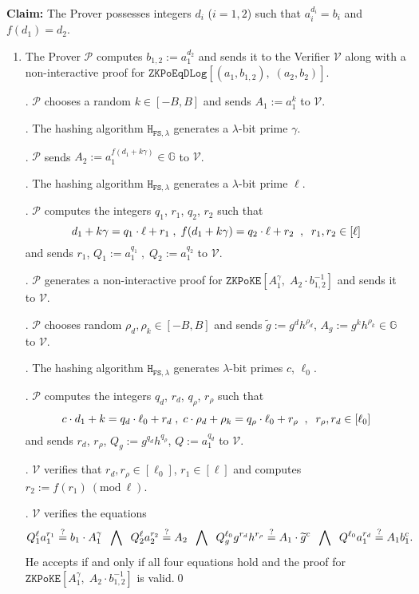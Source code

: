 \documentclass[11pt, lettersize, notitlepage, leqno, footskip=0.6cm]{article}
\newcommand{\ttt}{\texttt}
\newcommand{\bG}{\mathbb{G}}
\newcommand{\wti}{\widetilde}
\newcommand{\mc}{\mathcal}
\newcommand{\lam}{\lambda}
\newcommand{\mP}{\mc{P}}
\newcommand{\V}{\mc{V}}
\newcommand{\vs}{\vspace{-0.15cm}}
\newcommand{\noin}{\noindent}
\newcommand{\sta}{\stackrel{?}{=}}
\newcommand{\Mod}[1]{\ (\mathrm{mod}\ #1)}
\numberwithin{equation}{section}
\begin{document}
\noin \textbf{Claim:} The Prover possesses integers $d_i$ ($i=1,2$) such that $a_i^{d_i} = b_i$ and $f(d_1) = d_2$.

\begin{enumerate}[wide, labelwidth=!, labelindent=0pt]\vs \item  The Prover $\mP$ computes $b_{1,2}:= a_1^{d_2}$ and sends it to the Verifier $\V$ along with a non-interactive proof for $\ttt{ZKPoEqDLog}[(a_1,b_{1,2}),\;(a_2,b_2)]$.

\noin 2. $\mP$ chooses a random $k\in[-B,B]$ and sends $A_1:= a_1^{k}$ to $\V$.

\noin 3. The hashing algorithm $\ttt{H}_{\ttt{FS},\lam}$ generates a $\lam$-bit prime $\gamma$.

\noin 4. $\mP$ sends $A_2:= a_1^{f(d_1+k\gamma)}\in\bG$ to $\V$.

\noin 5. The hashing algorithm $\ttt{H}_{\ttt{FS},\lam}$ generates a $\lam$-bit prime $\ell$.

\noin 6. $\mP$ computes the integers $q_1$, $r_1$, $q_2$, $r_2$ such that \vs $$d_1+k\gamma = q_1\cdot \ell + r_1\;,\; f(d_1+k\gamma) = q_2\cdot \ell + r_2\;\;,\;\;r_1,r_2\in [\ell]   \vs $$ and sends $r_1$, $Q_1:= a_1^{q_1}\;,\; Q_2:= a_1^{q_2}$ to $\V$.

\noin 7. $\mP$ generates a non-interactive proof for $\ttt{ZKPoKE}[A_1^{\gamma},\; A_2\cdot b_{1,2}^{-1}]$ and sends it to $\V$.

\noin 8. $\mP$ chooses random $\rho_d,\rho_k\in [-B, B]$ and sends $\wti{g}:= g^d h^{\rho_d}$, $A_g:= g^k h^{\rho_k}\in \bG$ to $\V$.

\noin 9. The hashing algorithm $\ttt{H}_{\ttt{FS},\lam}$ generates $\lam$-bit primes $c$, $\ell_0$. 

\noin 10. $\mP$ computes the integers $q_d$, $r_d$, $q_{\rho}$, $r_{\rho}$ such that \vs $$c\cdot d_1 + k = q_d\cdot \ell_0 + r_d\;,\; c\cdot \rho_d + \rho_k = q_{\rho}\cdot \ell_0 + r_{\rho}\;\;,\;\;r_{\rho},r_d\in [\ell_0] \vs $$ and sends $r_{d}$, $r_{\rho}$, $Q_g:= g^{q_d}h^{q_{\rho}}$, $Q:= a_1^{q_d}$ to $\V$.

\noin 11. $\V$ verifies that $r_{d}, r_{\rho}\in [\ell_0]$, $r_1\in [\ell]$ and computes $r_2:= f(r_1)\Mod{\ell}$.

\noin 12. $\V$ verifies the equations \vs $$Q_1^{\ell}a_1^{r_1} \sta b_1 \cdot A_1^{\gamma}\;\;\bigwedge\;\; Q_2^{\ell}a_2^{r_2} \sta A_2 \;\;\bigwedge\;\; Q_g^{\ell_0}g^{r_d}h^{r_{\rho}}\sta A_1\cdot \wti{g}^c \;\;\bigwedge\;\; Q^{\ell_0}a_1^{r_d}\sta A_1 b_1^c .\vs $$ He accepts if and only if all four equations hold and the proof for $\ttt{ZKPoKE}[A_1^{\gamma},\; A_2\cdot b_{1,2}^{-1}]$ is valid.\qed \end{enumerate}
\end{document}
